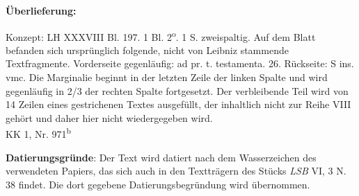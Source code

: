       
               
                \begin{ledgroupsized}[r]{120mm}
                \footnotesize 
                \pstart                
                \noindent\textbf{\"{U}berlieferung:}   
                \pend
                \end{ledgroupsized}
            
              
                            \begin{ledgroupsized}[r]{114mm}
                            \footnotesize 
                            \pstart \parindent -6mm
                            Konzept: LH XXXVIII Bl. 197. 1 Bl. 2\textsuperscript{o}. 1 S. zweispaltig. Auf dem Blatt befanden sich urspr\"{u}nglich folgende, nicht von Leibniz stammende Textfragmente. Vorderseite gegenl\"{a}ufig: ad pr. t. testamenta. 26. R\"{u}ckseite: S ins. vmc. Die Marginalie beginnt in der letzten Zeile der linken Spalte und wird gegenl\"{a}ufig in 2/3 der rechten Spalte fortgesetzt. Der verbleibende Teil wird von 14 Zeilen eines gestrichenen Textes ausgef\"{u}llt, der inhaltlich nicht zur Reihe VIII geh\"{o}rt und daher hier nicht wiedergegeben wird.\\KK 1, Nr. 971\textsuperscript{b} \pend
                            \end{ledgroupsized}
                \vspace*{5mm}
                \begin{ledgroup}
                \footnotesize 
                \pstart
            \noindent\footnotesize{\textbf{Datierungsgr\"{u}nde}: Der Text wird datiert nach dem Wasserzeichen des verwendeten Papiers, das sich auch in den Textträgern des Stücks \textit{LSB} VI, 3 N. 38 findet. Die dort gegebene Datierungsbegr\"{u}ndung wird \"{u}bernommen.}
                \pend
                \end{ledgroup}
            

